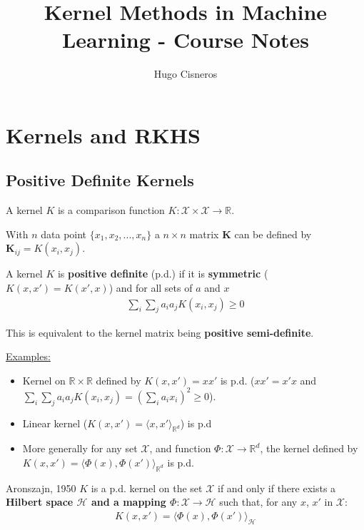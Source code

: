 \documentclass{article}
\title{Kernel Methods in Machine Learning - Course Notes}
\author{Hugo Cisneros}
\date{}
\begin{document}
\maketitle

\section{Kernels and RKHS}

\subsection{Positive Definite Kernels}

\begin{Definition}{}{}
    A kernel $K$ is  a comparison function $K: \mathcal{X}\times\mathcal{X}
 \rightarrow \mathbb{R}$.


    With $n$ data point $\{x_1, x_2, ..., x_n\}$ a $n \times n$ matrix 
    $\mathbf{K}$ can be defined by $\mathbf{K}_{ij} = K(x_i, x_j)$.

    A kernel $K$ is \textbf{positive definite} (p.d.) if it is 
    \textbf{symmetric} ($K(x, x') = K(x', x)$) and for all sets of $a$ and $x$
    \begin{align*}
        \boxed{\sum_i\sum_j a_i a_j K(x_i, x_j) \geq 0}
    \end{align*}
\end{Definition}

This is equivalent to the kernel matrix being \textbf{positive semi-definite}. 

\underline{Examples:}\begin{itemize}
    \item Kernel on $\mathbb{R}\times\mathbb{R}$  defined by 
    $K(x, x') = xx'$ is p.d. ($xx' = x'x$ and $ \sum_i\sum_j a_i a_j 
    K(x_i, x_j) = \left(\sum_i a_i x_i\right)^2 \geq 0$).
    \item Linear kernel ($K(x, x') = \langle x, x'\rangle_{\mathbb{R}^d}$) is 
    p.d 
    \item More generally for any set $\mathcal{X}$, and function $\Phi: 
    \mathcal{X} \rightarrow \mathbb{R}^d$, the kernel defined by $K(x,x') = 
    \langle \Phi(x), \Phi(x') \rangle_{\mathbb{R}^d}$ is p.d.
\end{itemize} 

\begin{Theorem}{Aronszajn, 1950}{}
    $K$ is a p.d. kernel on the set $\mathcal{X}$ if and only if there exists a 
    \textbf{Hilbert space $\mathcal{H}$ and a mapping $\Phi : \mathcal{X} 
    \rightarrow \mathcal{H}$} such that, for any $x$, $x'$ in $\mathcal{X}$:
    \begin{align*}
        \boxed{K(x, x') = \langle \Phi(x), \Phi(x') \rangle_\mathcal{H}}
    \end{align*}
\end{Theorem}
\end{document}
